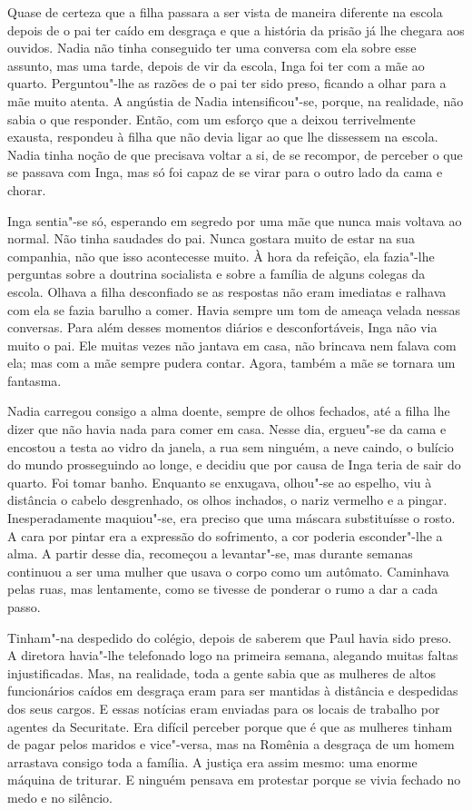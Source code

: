 Quase de certeza que a filha passara a ser vista de maneira diferente na
escola depois de o pai ter caído em desgraça e que a história da prisão
já lhe chegara aos ouvidos. Nadia não tinha conseguido ter uma conversa
com ela sobre esse assunto, mas uma tarde, depois de vir da escola, Inga
foi ter com a mãe ao quarto. Perguntou"-lhe as razões de o pai ter sido
preso, ficando a olhar para a mãe muito atenta. A angústia de Nadia
intensificou"-se, porque, na realidade, não sabia o que responder. Então,
com um esforço que a deixou terrivelmente exausta, respondeu à filha
que não devia ligar ao que lhe dissessem na escola. Nadia tinha noção de
que precisava voltar a si, de se recompor, de perceber o que se
passava com Inga, mas só foi capaz de se virar para o outro lado da cama
e chorar.

Inga sentia"-se só, esperando em segredo por uma mãe
que nunca mais voltava ao normal. Não tinha saudades do pai. Nunca
gostara muito de estar na sua companhia, não que isso acontecesse muito.
À hora da refeição, ela fazia"-lhe perguntas sobre a doutrina socialista e sobre a família de alguns
colegas da escola. Olhava a filha desconfiado se as respostas não eram
imediatas e ralhava com ela se fazia barulho a comer. Havia sempre um
tom de ameaça velada nessas conversas. Para além desses momentos diários
e desconfortáveis, Inga não via muito o pai. Ele muitas vezes não
jantava em casa, não brincava nem falava com ela; mas com a mãe sempre
pudera contar. Agora, também a mãe se tornara um fantasma.

\bigskip

Nadia carregou consigo a alma doente, sempre de olhos fechados, até a
filha lhe dizer que não havia nada para comer em casa. Nesse dia,
ergueu"-se da cama e encostou a testa ao vidro da janela, a rua sem
ninguém, a neve caindo, o bulício do mundo prosseguindo ao longe, e
decidiu que por causa de Inga teria de sair do quarto. Foi tomar banho.
Enquanto se enxugava, olhou"-se ao espelho, viu à distância o cabelo
desgrenhado, os olhos inchados, o nariz vermelho e a pingar.
Inesperadamente maquiou"-se, era preciso que uma máscara substituísse o rosto. A cara por pintar
era a expressão do sofrimento, a cor poderia esconder"-lhe a alma. A
partir desse dia, recomeçou a levantar"-se, mas durante semanas continuou
a ser uma mulher que usava o corpo como um autômato. Caminhava pelas
ruas, mas lentamente, como se tivesse de ponderar o rumo a dar a cada
passo.

Tinham"-na despedido do colégio, depois de saberem que Paul havia sido
preso. A diretora havia"-lhe telefonado logo na primeira semana,
alegando muitas faltas injustificadas. Mas, na realidade, toda a gente
sabia que as mulheres de altos funcionários caídos em desgraça eram para ser mantidas à
distância e despedidas dos seus cargos. E essas notícias eram enviadas
para os locais de trabalho por agentes da Securitate. Era difícil
perceber porque que é que as mulheres tinham de pagar pelos maridos e
vice"-versa, mas na Romênia a desgraça de um homem arrastava consigo
toda a família. A justiça era assim mesmo: uma enorme máquina de
triturar. E ninguém pensava em protestar porque se vivia fechado no
medo e no silêncio.

